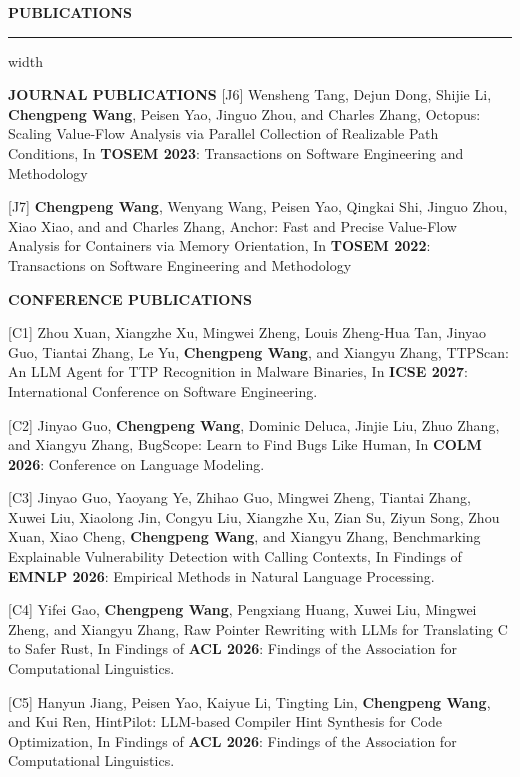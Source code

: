 \documentclass[centered]{resume}
\newlength{\cvsectiongap}
\newenvironment{rSection}[1]{%
  \par\Needspace{5\baselineskip}\addvspace{\cvsectiongap}
  {\bfseries \MakeUppercase{#1}}\vspace{0.65em}%
  \noindent\hrule width \linewidth\vspace{-0.45em}\par
}{\par}
\newenvironment{subsection*}[4]{%
  \par\Needspace{5\baselineskip}\noindent #1\par\nobreak
}{}
\begin{document}
\begin{resume}
\begin{rSection}{Publications}
\begin{subsection*}{\textbf{JOURNAL PUBLICATIONS}}{}{}{}
[J6] Wensheng Tang, Dejun Dong, Shijie Li, \textbf{Chengpeng Wang}, Peisen Yao, Jinguo Zhou, and Charles Zhang, Octopus: Scaling Value-Flow Analysis via Parallel Collection of Realizable Path Conditions, In \textbf{TOSEM 2023}: Transactions on Software Engineering and Methodology

[J7] \textbf{Chengpeng Wang}, Wenyang Wang, Peisen Yao, Qingkai Shi, Jinguo Zhou, Xiao Xiao, and and Charles Zhang, Anchor: Fast and Precise Value-Flow Analysis for Containers via Memory Orientation, In \textbf{TOSEM 2022}: Transactions on Software Engineering and Methodology

\end{subsection*}


\begin{subsection*}{\textbf{CONFERENCE PUBLICATIONS}}{}{}{}
\vspace{-1.5mm}

[C1] Zhou Xuan, Xiangzhe Xu, Mingwei Zheng, Louis Zheng-Hua Tan, Jinyao Guo, Tiantai Zhang, Le Yu, \textbf{Chengpeng Wang}, and Xiangyu Zhang, TTPScan: An LLM Agent for TTP Recognition in Malware Binaries, In \textbf{ICSE 2027}: International Conference on Software Engineering.

[C2] Jinyao Guo, \textbf{Chengpeng Wang}, Dominic Deluca, Jinjie Liu, Zhuo Zhang, and Xiangyu Zhang, BugScope: Learn to Find Bugs Like Human, In \textbf{COLM 2026}: Conference on Language Modeling.

[C3] Jinyao Guo, Yaoyang Ye, Zhihao Guo, Mingwei Zheng, Tiantai Zhang, Xuwei Liu, Xiaolong Jin, Congyu Liu, Xiangzhe Xu, Zian Su, Ziyun Song, Zhou Xuan, Xiao Cheng, \textbf{Chengpeng Wang}, and Xiangyu Zhang, Benchmarking Explainable Vulnerability Detection with Calling Contexts, In Findings of \textbf{EMNLP 2026}: Empirical Methods in Natural Language Processing.

[C4] Yifei Gao, \textbf{Chengpeng Wang}, Pengxiang Huang, Xuwei Liu, Mingwei Zheng, and Xiangyu Zhang, Raw Pointer Rewriting with LLMs for Translating C to Safer Rust, In Findings of \textbf{ACL 2026}: Findings of the Association for Computational Linguistics.

[C5] Hanyun Jiang, Peisen Yao, Kaiyue Li, Tingting Lin, \textbf{Chengpeng Wang}, and Kui Ren, HintPilot: LLM-based Compiler Hint Synthesis for Code Optimization, In Findings of \textbf{ACL 2026}: Findings of the Association for Computational Linguistics.


\end{subsection*}
\end{rSection}
\end{resume}
\end{document}
